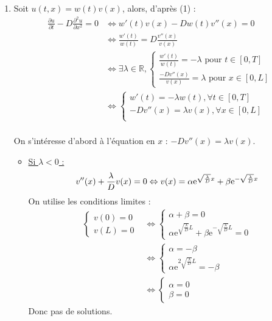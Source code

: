 \documentclass[12pt,a4paper]{article}
\begin{document}
\begin{enumerate}
    \item Soit $u(t, x) = w(t)v(x)$, alors, d'après (1) :
    \begin{align*}
        \frac{\partial u}{\partial t} - D \frac{\partial^2 u}{\partial x^2} = 0
        &\Leftrightarrow 
        w'(t)v(x) - D w(t) v''(x) = 0\\
        &\Leftrightarrow
        \frac{w'(t)}{w(t)} = D \frac{v''(x)}{v(x)}\\
        &\Leftrightarrow
        \exists \lambda \in \mathbb{R},
        \begin{cases}
            \frac{w'(t)}{w(t)} = -\lambda \text{ pour } t \in [0, T]\\
            \frac{-D v''(x)}{v(x)} = \lambda \text{ pour } x \in [0, L]
        \end{cases}\\
        &\Leftrightarrow
        \begin{cases}
            w'(t) = -\lambda w(t), \forall t \in [0, T]\\
            -D v''(x) = \lambda v(x), \forall x \in [0, L]\\
        \end{cases}
    \end{align*}\\


    On s'intéresse d'abord à l'équation en $x$ : $-D v''(x) = \lambda v(x)$.
    \begin{itemize}
        \item \underline{Si $\lambda < 0$ :}
        $$
        v''(x) + \frac{\lambda}{D} v(x) = 0
        \Leftrightarrow
        v(x) = \alpha \mathrm{e}^{\sqrt{\frac{\lambda}{D}} x} + \beta \mathrm{e}^{-\sqrt{\frac{\lambda}{D}} x}\\
        $$
        On utilise les conditions limites :
        \begin{align*}
            \begin{cases}
                v(0) = 0\\
                v(L) = 0
            \end{cases}
            &\Leftrightarrow
            \begin{cases}
                \alpha + \beta = 0\\
                \alpha \mathrm{e}^{\sqrt{\frac{\lambda}{D}} L} + \beta \mathrm{e}^{-\sqrt{\frac{\lambda}{D}} L} = 0
            \end{cases}\\
            &\Leftrightarrow
            \begin{cases}
                \alpha = -\beta\\
                \alpha \mathrm{e}^{2\sqrt{\frac{\lambda}{D}} L} = -\beta
            \end{cases}\\
            &\Leftrightarrow
            \begin{cases}
                \alpha = 0\\
                \beta = 0
            \end{cases}
        \end{align*}
        Donc pas de solutions.


\end{itemize}
\end{enumerate}
\end{document}
